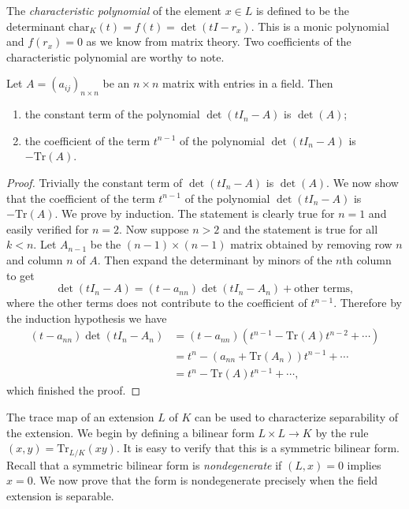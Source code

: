 The \textit{characteristic polynomial} of the element $x\in L$ is defined to be the determinant $\mathrm{char}_K(t)=f(t)=\det(tI-r_x)$. This is a monic polynomial and $f(r_x)=0$ as we know from matrix theory. Two coefficients of the characteristic polynomial are worthy to note.
\begin{proposition}
Let $A=(a_{ij})_{n\times n}$ be an $n\times n$ matrix with entries in a field. Then 
\begin{enumerate}
    \item the constant term of the polynomial $\det(tI_n-A)$ is $\det(A)$;
    \item the coefficient of the term $t^{n-1}$ of the polynomial $\det(tI_n-A)$ is $-\mathrm{Tr}(A)$.
\end{enumerate}
\end{proposition}
\begin{proof}
Trivially the constant term of $\det(tI_n-A)$ is $\det(A)$. We now show that the coefficient of the term $t^{n-1}$ of the polynomial $\det(tI_n-A)$ is $-\mathrm{Tr}(A)$. We prove by induction. The statement is clearly true for $n=1$ and easily verified for $n=2$. Now suppose $n>2$ and the statement is true for all $k<n$. Let $A_{n-1}$ be the $(n-1)\times(n-1)$ matrix obtained by removing row $n$ and column $n$ of $A$. Then expand the determinant by minors of the $n$th column to get 
$$
\det \left( tI_n-A \right) =\left( t-a_{nn} \right) \det \left( tI_n-A_n \right) +\text{other terms},
$$
where the other terms does not contribute to the coefficient of $t^{n-1}$. Therefore by the induction hypothesis we have 
$$
\begin{aligned}
\left( t-a_{nn} \right) \det \left( tI_n-A_n \right) &=\left( t-a_{nn} \right) \left( t^{n-1}-\mathrm{Tr}\left( A \right) t^{n-2}+\cdots \right) 
\\
&=t^n-\left( a_{nn}+\mathrm{Tr}\left( A_n \right) \right) t^{n-1}+\cdots 
\\
&=t^n-\mathrm{Tr}\left( A \right) t^{n-1}+\cdots ,
\end{aligned}
$$
which finished the proof.
\end{proof}
The trace map of an extension $L$ of $K$ can be used to characterize separability of the extension. We begin by defining a bilinear form $L\times L\to K$ by the rule $(x,y)=\mathrm{Tr}_{L/K}(xy)$. It is easy to verify that this is a symmetric bilinear form. Recall that a symmetric bilinear form is \textit{nondegenerate} if $(L,x)=0$ implies $x=0$. We now prove that the form is nondegenerate precisely when the field extension is separable.
